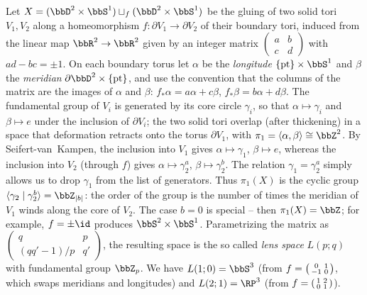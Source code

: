 \begin{example}\label{example Lens space bredon}
    Let $X=(\bbD^2\times \bbS^1)\sqcup_f (\bbD^2\times \bbS^1)$ be the gluing of two solid tori $V_1,V_2$ along a homeomorphism $f:\partial V_1\to\partial V_2$ of their boundary tori, induced from the linear map $\bbR^2\to\bbR^2$ given by an integer matrix $\begin{pmatrix}a&b\\c&d\end{pmatrix}$ with $ad-bc=\pm1$. On each boundary torus let $\alpha$ be the \emph{longitude} $\{\mathrm{pt}\}\times\bbS^1$ and $\beta$ the \emph{meridian} $\partial\bbD^2\times\{\mathrm{pt}\}$, and use the convention that the columns of the matrix are the images of $\alpha$ and $\beta$: $f_\ast\alpha=a\alpha+c\beta$, $f_\ast\beta=b\alpha+d\beta$. The fundamental group of $V_i$ is generated by its core circle $\gamma_i$, so that $\alpha\mapsto\gamma_i$ and $\beta\mapsto e$ under the inclusion of $\partial V_i$; the two solid tori overlap (after thickening) in a space that deformation retracts onto the torus $\partial V_1$, with $\pi_1=\langle\alpha,\beta\rangle\cong\bbZ^2$. By Seifert-van~Kampen, the inclusion into $V_1$ gives $\alpha\mapsto\gamma_1$, $\beta\mapsto e$, whereas the inclusion into $V_2$ (through $f$) gives $\alpha\mapsto\gamma_2^a$, $\beta\mapsto \gamma_2^b$. The relation $\gamma_1=\gamma_2^a$ simply allows us to drop $\gamma_1$ from the list of generators. Thus $\pi_1(X)$ is the cyclic group $\langle \gamma_2\mid \gamma_2^b\rangle=\bbZ_{\lvert b\rvert}$: the order of the group is the number of times the meridian of $V_1$ winds along the core of $V_2$. The case $b=0$ is special -- then $\pi_1(X)=\bbZ$; for example, $f=\pm\id$ produces $\bbS^2\times\bbS^1$. Parametrizing the matrix as $\begin{pmatrix}q&p\\(qq'-1)/p&q'\end{pmatrix}$, the resulting space is the so called \emph{lens space} $L(p;q)$ with fundamental group $\bbZ_p$. We have $L(1;0)=\bbS^3$ (from $f=\begin{psmallmatrix}0&1\\-1&0\end{psmallmatrix}$, which swaps meridians and longitudes) and $L(2;1)=\RP^3$ (from $f=\begin{psmallmatrix}1&2\\0&1\end{psmallmatrix}$).
\end{example}

